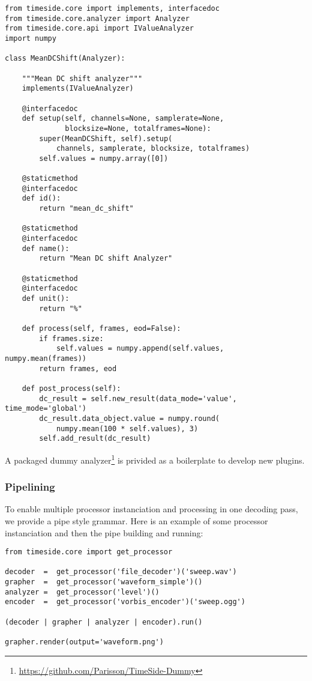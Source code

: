 \documentclass{article}
\begin{document}
\begin{lstlisting}
from timeside.core import implements, interfacedoc
from timeside.core.analyzer import Analyzer
from timeside.core.api import IValueAnalyzer
import numpy

class MeanDCShift(Analyzer):

    """Mean DC shift analyzer"""
    implements(IValueAnalyzer)

    @interfacedoc
    def setup(self, channels=None, samplerate=None,
              blocksize=None, totalframes=None):
        super(MeanDCShift, self).setup(
            channels, samplerate, blocksize, totalframes)
        self.values = numpy.array([0])

    @staticmethod
    @interfacedoc
    def id():
        return "mean_dc_shift"

    @staticmethod
    @interfacedoc
    def name():
        return "Mean DC shift Analyzer"

    @staticmethod
    @interfacedoc
    def unit():
        return "%"

    def process(self, frames, eod=False):
        if frames.size:
            self.values = numpy.append(self.values, numpy.mean(frames))
        return frames, eod

    def post_process(self):
        dc_result = self.new_result(data_mode='value', time_mode='global')
        dc_result.data_object.value = numpy.round(
            numpy.mean(100 * self.values), 3)
        self.add_result(dc_result)
\end{lstlisting}

A packaged dummy analyzer\footnote{\tiny\url{https://github.com/Parisson/TimeSide-Dummy}} is privided as a boilerplate to develop new plugins.

\subsubsection{Pipelining}

To enable multiple processor instanciation and processing in one decoding pass, we provide a pipe style grammar. Here is an example of some processor instanciation and then the pipe building and running:

\begin{lstlisting}
from timeside.core import get_processor

decoder  =  get_processor('file_decoder')('sweep.wav')
grapher  =  get_processor('waveform_simple')()
analyzer =  get_processor('level')()
encoder  =  get_processor('vorbis_encoder')('sweep.ogg')

(decoder | grapher | analyzer | encoder).run()

grapher.render(output='waveform.png')
\end{lstlisting}
\end{document}
